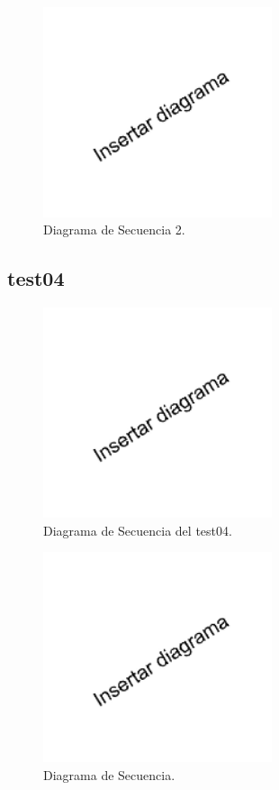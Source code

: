 \documentclass[titlepage,a4paper]{article}
\begin{document}
\begin{figure}[H]
	\centering
	\includegraphics[width=0.6\textwidth]{diagrama_secuencia02.png}
	\caption{\label{fig:seq02} Diagrama de Secuencia 2.}
\end{figure}

\subsection{test04}

\begin{figure}[H]
  \centering
  \includegraphics[width=0.6\textwidth]{diagrama_secuencia03.png}
  \caption{\label{fig:seq03}Diagrama de Secuencia del test04.}
  \end{figure}

  \begin{figure}[H]
    \centering
    \includegraphics[width=0.6\textwidth]{diagrama_secuencia04.png}
    \caption{\label{fig:seq04}Diagrama de Secuencia.}
    \end{figure}
\end{document}

